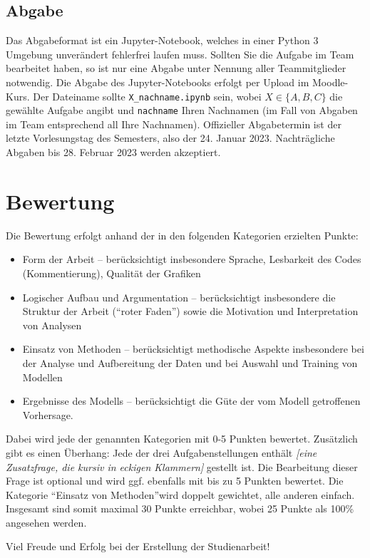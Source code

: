 \documentclass[11pt,a4paper]{article}
\begin{document}
\subsection*{Abgabe}
Das Abgabeformat ist ein Jupyter-Notebook, welches in einer Python 3 Umgebung unverändert fehlerfrei laufen muss. Sollten Sie die Aufgabe im Team bearbeitet haben, so ist nur eine Abgabe unter Nennung aller Teammitglieder notwendig.
Die Abgabe des Jupyter-Notebooks erfolgt per Upload im Moodle-Kurs. Der Dateiname sollte \texttt{X\_nachname.ipynb} sein, wobei $X\in\lbrace A,B,C\rbrace$ die gewählte Aufgabe angibt und \texttt{nachname} Ihren Nachnamen (im Fall von Abgaben im Team entsprechend all Ihre Nachnamen).
Offizieller Abgabetermin ist der letzte Vorlesungstag des Semesters, also der 24. Januar 2023. Nachträgliche Abgaben bis 28. Februar 2023 werden akzeptiert.

\section*{Bewertung}
Die Bewertung erfolgt anhand der in den folgenden Kategorien erzielten Punkte:
\begin{itemize}
	\item Form der Arbeit -- berücksichtigt insbesondere Sprache, Lesbarkeit des Codes (Kommentierung), Qualität der Grafiken
	\item Logischer Aufbau und Argumentation -- berücksichtigt insbesondere die Struktur der Arbeit (``roter Faden'') sowie die Motivation und Interpretation von Analysen
	\item Einsatz von Methoden -- berücksichtigt methodische Aspekte insbesondere bei der Analyse und Aufbereitung der Daten und bei Auswahl und Training von Modellen
	\item Ergebnisse des Modells -- berücksichtigt die Güte der vom Modell getroffenen Vorhersage.
\end{itemize}
Dabei wird jede der genannten Kategorien mit 0-5 Punkten bewertet. 
Zusätzlich gibt es einen Überhang: Jede der drei Aufgabenstellungen enthält \emph{[eine Zusatzfrage, die kursiv in eckigen Klammern]} gestellt ist. Die Bearbeitung dieser Frage ist optional und wird ggf. ebenfalls mit bis zu 5 Punkten bewertet.
Die Kategorie ``Einsatz von Methoden''wird doppelt gewichtet, alle anderen einfach. Insgesamt sind somit maximal 30 Punkte erreichbar, wobei 25 Punkte als 100\% angesehen werden.
\vspace{3cm}
\begin{center}
	Viel Freude und Erfolg bei der Erstellung der Studienarbeit!
\end{center}
\end{document}
